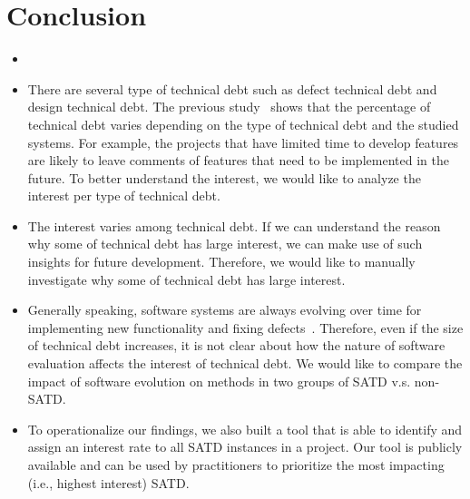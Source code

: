 \section{Conclusion} \label{conclusion}
%


\begin{itemize}
\item {}
\item  There are several type of technical debt such as defect technical debt and design technical debt.
The previous study~\cite{Maldonado2015MTD} shows that the percentage of technical debt varies depending on the type of technical debt and the studied systems. For example, the projects that have limited time to develop features are likely to leave comments of features that need to be implemented in the future. 
To better understand the interest, we would like to analyze the interest per type of technical debt.
\item  The interest varies among technical debt. If we can understand the reason why some of technical debt has large interest, we can make use of such insights for future development. Therefore, we would like to manually investigate why some of technical debt has large interest.
\item Generally speaking, software systems are always evolving over time for implementing new functionality and fixing defects~\cite{xxx}.
Therefore, even if the size of technical debt increases, it is not clear about how the nature of software evaluation affects the interest of technical debt.
We would like to compare the impact of software evolution on methods in two groups of SATD v.s. non-SATD.
\item To operationalize our findings, we also built a tool that is able to identify and assign an interest rate to all SATD instances in a project. Our tool is publicly available and can be used by practitioners to prioritize the most impacting (i.e., highest interest) SATD.
\end{itemize}
